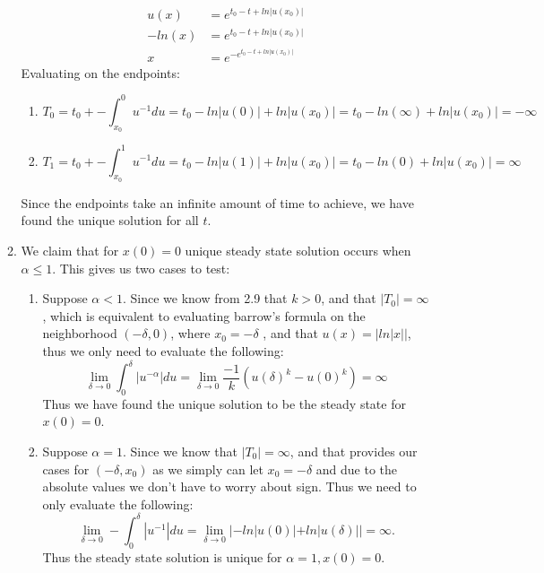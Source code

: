 \documentclass[12pt, letterpaper]{article}
\begin{document}
\begin{enumerate}
\begin{enumerate}
\begin{align*}
				u(x) &= e^{t_0 -t + ln|u(x_0)|}\\
				-ln(x) &= e^{t_0 -t + ln|u(x_0)|}\\
				x &= e^{-e^{t_0 -t + ln|u(x_0)|}}				
			\end{align*}
			Evaluating on the endpoints:
			\begin{enumerate}
				\item $$T_0 = t_0 + -\int_{x_0}^0 u^{-1}du = t_0 - ln|u(0)| + ln|u(x_0)| = t_0 - ln(\infty) + ln|u(x_0)| = -\infty$$
				\item $$T_1 = t_0 + -\int_{x_0}^1 u^{-1}du = t_0 - ln|u(1)| + ln|u(x_0)| = t_0 - ln(0) + ln|u(x_0)|= \infty$$
			\end{enumerate}
			Since the endpoints take an infinite amount of time to achieve, we have found the unique solution for all $t$.
			\iffalse
			However, if $\alpha > 1$, by the equation we got via barrows formula, then $1-\alpha = k < 1$.  Since $k$ is negative, then $u(0)^k = (-ln(0))^k = \infty^k = 0$, therefore: 
			\begin{equation*}
				t_0 + -\int_{x_0}^0 u^{-\alpha} = t_0 + \frac{-1}{k}(u(0)^{k}-u(x_0)^{k}) = t_0 + \frac{u(x_0)^{k}}{k} < \infty
			\end{equation*}
			On the other hand										
			\fi
			\item We claim that for $x(0) = 0$ unique steady state solution occurs when $\alpha \leq 1$.  This gives us two cases to test:
			\begin{enumerate}
				\item Suppose $\alpha < 1$.  Since we know from 2.9 that $k>0$, and that $|T_0| = \infty$, which is equivalent to evaluating barrow's formula on the neighborhood $(-\delta,0)$, where $x_0 = -\delta$ , and that $u(x) = |ln|x||$, thus we only need to evaluate the following:
				$$
					\lim_{\delta \to 0} \int_{0}^\delta |u^{-\alpha}| du = \lim_{\delta \to 0} \frac{-1}{k}(u(\delta)^k - u(0)^k) = \infty				
				$$ 
				Thus we have found the unique solution to be the steady state for $x(0) = 0$.
				\item Suppose $\alpha = 1$.  Since we know that $|T_0| = \infty$, and that provides our cases for $(-\delta, x_0)$ as we simply can let $x_0 = -\delta$ and due to the absolute values we don't have to worry about sign.  Thus we need to only evaluate the following:
				$$
					\lim_{\delta \to 0} -\int_{0}^\delta |u^{-1}| du = \lim_{\delta \to 0} |-ln|u(0)| + ln|u(\delta)|| = \infty.
				$$
				Thus the steady state solution is unique for $\alpha = 1, x(0) = 0$.
				

\end{enumerate}
\end{enumerate}
\end{enumerate}
\end{document}
